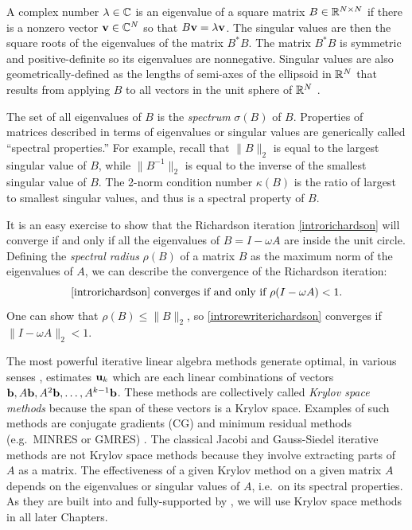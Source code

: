 A complex number $\lambda \in \mathbb{C}$ is an eigenvalue of a square matrix $B\in\mathbb{R}^{N\times N}$ if there is a nonzero vector $\mathbf{v}\in\mathbb{C}^N$ so that $B \mathbf{v} = \lambda \mathbf{v}$.  The singular values are then the square roots of the eigenvalues of the matrix $B^*B$.  The matrix $B^*B$ is symmetric and positive-definite so its eigenvalues are nonnegative.  Singular values are also geometrically-defined as the lengths of semi-axes of the ellipsoid in $\mathbb{R}^N$ that results from applying $B$ to all vectors in the unit sphere of $\mathbb{R}^N$ \citep{TrefethenBau}.

The set of all eigenvalues of $B$ is the \emph{spectrum} $\sigma(B)$ of $B$.  Properties of matrices described in terms of eigenvalues or singular values are generically called ``spectral properties.''  For example, recall that $\|B\|_2$ is equal to the largest singular value of $B$, while $\|B^{-1}\|_2$ is equal to the inverse of the smallest singular value of $B$.  The 2-norm condition number $\kappa(B)$ is the ratio of largest to smallest singular values, and thus is a spectral property of $B$.

It is an easy exercise to show that the Richardson iteration \eqref{introrichardson} will converge if and only if all the eigenvalues of $B=I-\omega A$ are inside the unit circle.  Defining the \emph{spectral radius} $\rho(B)$ of a matrix $B$ as the maximum norm of the eigenvalues of $A$, we can describe the convergence of the Richardson iteration:
\begin{equation}
\text{\eqref{introrichardson} converges if and only if } \rho(I-\omega A) < 1. \label{introconvergethm}
\end{equation}
One can show that $\rho(B) \le \|B\|_2$, so \eqref{introrewriterichardson} converges if $\|I-\omega A\|_2 < 1$.

The most powerful iterative linear algebra methods generate optimal, in various senses \citep{TrefethenBau}, estimates $\mathbf{u}_k$ which are each linear combinations of vectors $\mathbf{b},A\mathbf{b},A^2\mathbf{b},\dots,A^{k-1}\mathbf{b}$.  These methods are collectively called \emph{Krylov space methods} because the span of these vectors is a Krylov space.  Examples of such methods are conjugate gradients (CG) and minimum residual methods (e.g.~MINRES or GMRES) \citep{Greenbaum1997,Saad2003}.  The classical Jacobi and Gauss-Siedel iterative methods are not Krylov space methods because they involve extracting parts of $A$ as a matrix.  The effectiveness of a given Krylov method on a given matrix $A$ depends on the eigenvalues or singular values of $A$, i.e.~on its spectral properties.  As they are built into and fully-supported by \PETSc, we will use Krylov space methods in all later Chapters.

